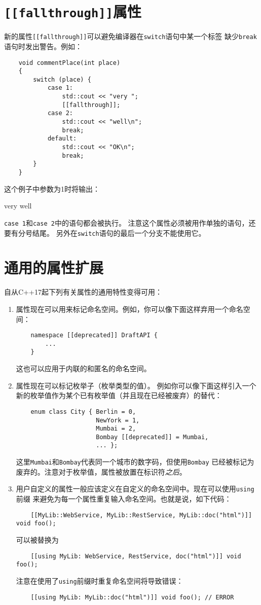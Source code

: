 \section{\texttt{[[fallthrough]]}属性}
新的属性\texttt{[[fallthrough]]}可以避免编译器在\texttt{switch}语句中某一个标签
缺少\texttt{break}语句时发出警告。例如：
\begin{lstlisting}
    void commentPlace(int place)
    {
        switch (place) {
            case 1:
                std::cout << "very ";
                [[fallthrough]];
            case 2:
                std::cout << "well\n";
                break;
            default:
                std::cout << "OK\n";
                break;
        }
    }
\end{lstlisting}
这个例子中参数为1时将输出：
\begin{blacklisting}
    very well
\end{blacklisting}
\texttt{case 1}和\texttt{case 2}中的语句都会被执行。
注意这个属性必须被用作单独的语句，还要有分号结尾。
另外在\texttt{switch}语句的最后一个分支不能使用它。


\section{通用的属性扩展}
自从C++17起下列有关属性的通用特性变得可用：
\begin{enumerate}
    \item 属性现在可以用来标记命名空间。例如，你可以像下面这样弃用一个命名空间：
    \begin{lstlisting}
    namespace [[deprecated]] DraftAPI {
        ...
    }
    \end{lstlisting}
    这也可以应用于内联的和匿名的命名空间。
    \item 属性现在可以标记枚举子（枚举类型的值）。
    例如你可以像下面这样引入一个新的枚举值作为某个已有枚举值（并且现在已经被废弃）的替代：
    \begin{lstlisting}
    enum class City { Berlin = 0,
                      NewYork = 1,
                      Mumbai = 2,
                      Bombay [[deprecated]] = Mumbai,
                      ... };
    \end{lstlisting}
    这里\texttt{Mumbai}和\texttt{Bombay}代表同一个城市的数字码，但使用\texttt{Bombay}
    已经被标记为废弃的。注意对于枚举值，属性被放置在标识符\emph{之后}。
    \item 用户自定义的属性一般应该定义在自定义的命名空间中。现在可以使用\texttt{using}前缀
    来避免为每一个属性重复输入命名空间。也就是说，如下代码：
    \begin{lstlisting}
    [[MyLib::WebService, MyLib::RestService, MyLib::doc("html")]] void foo();
    \end{lstlisting}
    可以被替换为
    \begin{lstlisting}
    [[using MyLib: WebService, RestService, doc("html")]] void foo();
    \end{lstlisting}
    注意在使用了\texttt{using}前缀时重复命名空间将导致错误：
    \begin{lstlisting}
    [[using MyLib: MyLib::doc("html")]] void foo(); // ERROR
    \end{lstlisting}
\end{enumerate}


